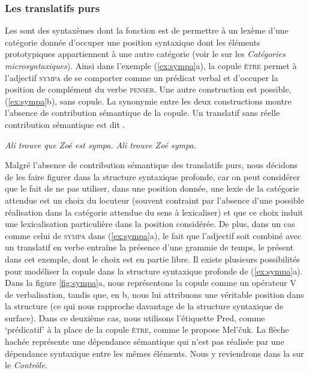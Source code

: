 \subsubsection{Les translatifs purs} 
Les  sont des syntaxèmes dont la fonction est de permettre à un lexème d’une catégorie donnée d’occuper une position syntaxique dont les éléments prototypiques appartiennent à une autre catégorie (voir le  sur les \textit{Catégories microsyntaxiques}). Ainsi dans l’exemple (\ref{ex:sympa}a), la copule \textsc{être} permet à l’adjectif \textsc{sympa} de se comporter comme un prédicat verbal et d’occuper la position de complément du verbe \textsc{penser}. Une autre construction est possible, (\ref{ex:sympa}b), sans copule. La synonymie entre les deux constructions montre l’absence de contribution sémantique de la copule. Un translatif sans réelle contribution sémantique est dit .

\ea\label{ex:sympa}
    \ea \textit{Ali trouve que Zoé est sympa.}
\ex \textit{Ali trouve Zoé sympa.}\z\z

Malgré l’absence de contribution sémantique des translatifs purs, nous décidons de les faire figurer dans la structure syntaxique profonde, car on peut considérer que le fait de ne pas utiliser, dans une position donnée, une lexie de la catégorie attendue est un choix du locuteur (souvent contraint par l’absence d’une possible réalisation dans la catégorie attendue du sens à lexicaliser) et que ce choix induit une lexicalisation particulière dans la position considérée. De plus, dans un cas comme celui de \textsc{sympa} dans (\ref{ex:sympa}a), le fait que l’adjectif soit combiné avec un translatif en verbe entraîne la présence d’une grammie de temps, le présent dans cet exemple, dont le choix est en partie libre. 
Il existe plusieurs possibilités pour modéliser la copule dans la structure syntaxique profonde de (\ref{ex:sympa}a). Dans la figure \ref{fig:sympa}a, nous représentons la copule comme un opérateur V de verbalisation, tandis que, en b, nous lui attribuons une véritable position dans la structure (ce qui nous rapproche davantage de la structure syntaxique de surface). Dans ce deuxième cas, nous utilisons l’étiquette Pred, comme ‘prédicatif’ à la place de la copule \textsc{être}, comme le propose Mel’čuk. La flèche hachée représente une dépendance sémantique qui n’est pas réalisée par une dépendance syntaxique entre les mêmes éléments. Nous y reviendrons dans la  sur le \textit{Contrôle}.

